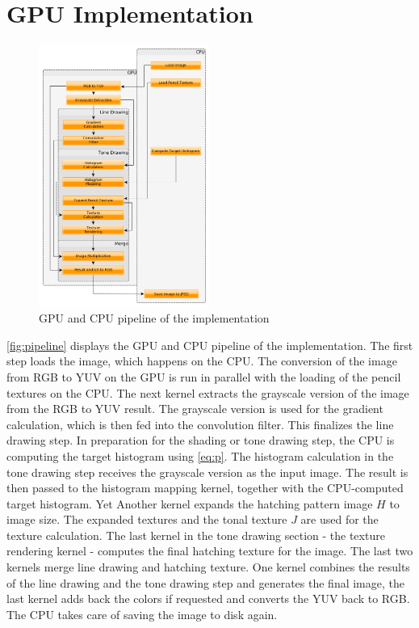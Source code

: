 \section{GPU Implementation} \label{gpu-implementation}

\begin{figure}[htb]
  \centering
  \includegraphics[width=0.5\textwidth]{images/pipeline.png}
  \caption{GPU and CPU pipeline of the implementation}
  \label{fig:pipeline}
\end{figure}

\autoref{fig:pipeline} displays the GPU and CPU pipeline of the implementation.
The first step loads the image, which happens on the CPU.  The conversion of
the image from RGB to YUV on the GPU is run in parallel with the loading of the
pencil textures on the CPU.  The next kernel extracts the grayscale version of
the image from the RGB to YUV result.  The grayscale version is used for the
gradient calculation, which is then fed into the convolution filter.  This
finalizes the line drawing step.  In preparation for the shading or tone drawing
step, the CPU is computing the target histogram using \autoref{eq:p}.  The histogram
calculation in the tone drawing step receives the grayscale version as the
input image. The result is then passed to the histogram mapping kernel,
together with the CPU-computed target histogram. Yet Another kernel expands the
hatching pattern image $H$ to image size. The expanded textures and the
tonal texture $J$ are used for the texture calculation. The last kernel
in the tone drawing section - the texture rendering kernel - computes the final
hatching texture for the image. The last two kernels merge line drawing and
hatching texture. One kernel combines the results of the line drawing and the
tone drawing step and generates the final image, the last kernel adds back the
colors if requested and converts the YUV back to RGB. The CPU takes care of
saving the image to disk again.

